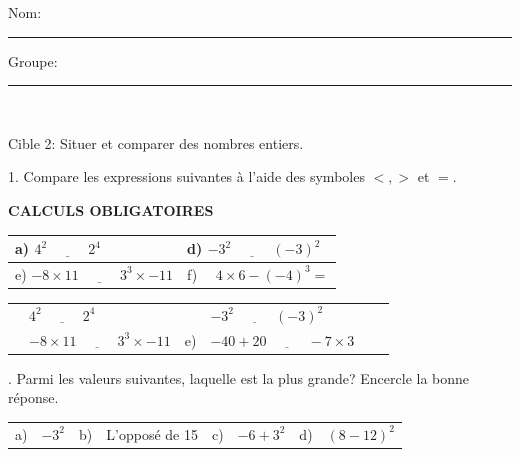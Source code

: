 \documentclass[11pt]{article}
\newcommand{\entete}{%
  \noindent Nom: \rule{6.5cm}{0.4pt} \hfill Groupe: \rule{3cm}{0.4pt}\\[4mm]
}
\begin{document}
\entete

\begin{cible}{Cible 2: Situer et comparer des nombres entiers.}

1. Compare les expressions suivantes à l'aide des symboles $<, >$ et $=$. 

\vspace{1cm}

\textbf{CALCULS OBLIGATOIRES}

\vspace{1cm}

\begin{tabular}{|p{7.7cm}|p{7.7cm}|}
\hline
\rule{0pt}{4mm} a) $4^2 \; \underline{\hspace{1cm}} \; 2^4$ & d) $-3^2 \; \underline{\hspace{1cm}} \; (-3)^2$ \\[3.2cm]
\hline
\rule{0pt}{4mm} e) $-8 \times 11 \; \underline{\hspace{1cm}} \; 3^3 \times -11$ & f) $\quad 4 \times 6 - (-4)^3 = $ \\[3.2cm]
\hline
\end{tabular}

\vspace{2mm}
\begin{tabular}{@{}p{0.5cm}p{5.5cm}@{}p{0.5cm}p{5.5cm}@{}p{0.5cm}p{4cm}@{}}
& $4^2 \; \underline{\hspace{1cm}} \; 2^4$ &  & $-3^2 \; \underline{\hspace{1cm}} \; (-3)^2$ \\[4mm]
& $-8 \times 11 \; \underline{\hspace{1cm}} \; 3^3 \times -11$ & e) & $-40 + 20 \; \underline{\hspace{1cm}} \; -7 \times 3$ \\

\end{tabular}


\vspace{6mm}
. Parmi les valeurs suivantes, laquelle est la plus grande? Encercle la bonne réponse.

\vspace{2mm}
\begin{tabular}{@{}p{0.5cm}p{3cm}p{0.5cm}p{3.5cm}p{0.5cm}p{3cm}p{0.5cm}p{3cm}@{}}
a) & $-3^2$ & b) & L'opposé de 15 & c) & $-6 + 3^2$ & d) & $(8-12)^2$ \\
\end{tabular}

\end{cible}
\end{document}
